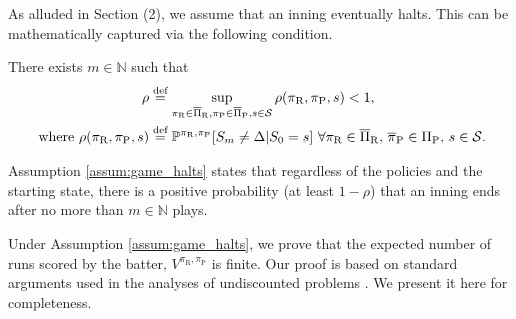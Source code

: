 \documentclass[opre,dblanonrev]{informs4}
\newcommand{\defeq}{\stackrel{\text{def}}{=}}
\begin{document}
\begin{APPENDICES}
       As alluded in Section (2), we assume that an inning eventually halts. This can be mathematically captured via the following condition.
       \begin{assumption}\label{assum:game_halts}
           There exists $m \in \mathbb{N}$ such that 
           \begingroup
           \allowdisplaybreaks
           \begin{align*}
                \rho &\defeq \sup_{\pi_\text{R} \in \overline\Pi_\text{R}, \pi_\text{P} \in \overline\Pi_\text{P}, s \in {\cal S}} \rho(\pi_\text{R},\pi_\text{P},s) < 1,\\
                \text{ where }       \rho(\pi_\text{R},\pi_\text{P},s) &\defeq \mathbb{P}^{\pi_\text{R}, \pi_\text{P}}[S_m \neq \Delta|S_0=s] \ \forall \pi_\text{R} \in \overline\Pi_\text{R}, \, \overline\pi_\text{P} \in \Pi_\text{P}, \, s \in {\cal S}.          
           \end{align*}
           \endgroup
       \end{assumption}
       \noindent Assumption \ref{assum:game_halts} states that regardless of the policies and the starting state, there is a positive probability (at least $1-\rho$) that an inning ends after no more than $m \in \mathbb{N}$ plays.
    
       Under Assumption \ref{assum:game_halts}, we prove that the expected number of runs scored by the batter, $V^{\pi_\text{R},\pi_\text{P}}$ is finite. Our proof is based on standard arguments used in the analyses of undiscounted problems \cite[Section 7.2]{bertsekas_dynamic_2012}. We present it here for completeness.  
    

\end{APPENDICES}
\end{document}
